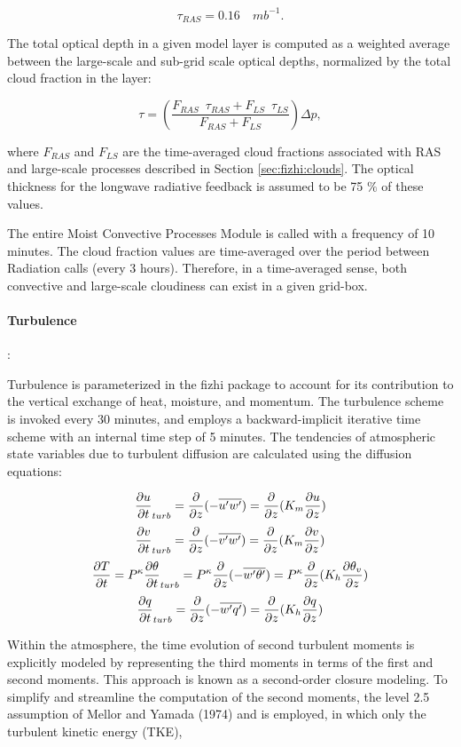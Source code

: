 \[ \tau_{RAS} = 0.16 \quad mb^{-1} . \]

The total optical depth in a given model layer is computed as a weighted average between
the large-scale and sub-grid scale optical depths, normalized by the total cloud fraction in the
layer:

\[ \tau = \left( \frac{F_{RAS} \,\,\, \tau_{RAS} + F_{LS} \,\,\, \tau_{LS} }{ F_{RAS}+F_{LS} } \right) \Delta p, \]

where $F_{RAS}$ and $F_{LS}$ are the time-averaged cloud fractions associated with RAS and large-scale
processes described in Section \ref{sec:fizhi:clouds}.
The optical thickness for the longwave radiative feedback is assumed to be 75 $\%$ of these values.

The entire Moist Convective Processes Module is called with a frequency of 10 minutes. 
The cloud fraction values are time-averaged over the period between Radiation calls (every 3
hours).  Therefore, in a time-averaged sense, both convective and large-scale 
cloudiness can exist in a given grid-box.  

\paragraph{Turbulence}:

Turbulence is parameterized in the fizhi package to account for its contribution to the
vertical exchange of heat, moisture, and momentum.  
The turbulence scheme is invoked every 30 minutes, and employs a backward-implicit iterative 
time scheme with an internal time step of 5 minutes.
The tendencies of atmospheric state variables due to turbulent diffusion are calculated using
the diffusion equations:

\[
{\frac{\partial u}{\partial t}}_{turb} = {\frac{\partial }{\partial z} }{(- \overline{u^{\prime}w^{\prime}})}
 = {\frac{\partial }{\partial z} }{(K_m \frac{\partial u}{\partial z})}
\]
\[
{\frac{\partial v}{\partial t}}_{turb} = {\frac{\partial }{\partial z} }{(- \overline{v^{\prime}w^{\prime}})}
 = {\frac{\partial }{\partial z} }{(K_m \frac{\partial v}{\partial z})}
\]
\[
{\frac{\partial T}{\partial t}} = P^{\kappa}{\frac{\partial \theta}{\partial t}}_{turb} = 
P^{\kappa}{\frac{\partial }{\partial z} }{(- \overline{w^{\prime}\theta^{\prime}})}
 = P^{\kappa}{\frac{\partial }{\partial z} }{(K_h \frac{\partial \theta_v}{\partial z})}
\]
\[
{\frac{\partial q}{\partial t}}_{turb} = {\frac{\partial }{\partial z} }{(- \overline{w^{\prime}q^{\prime}})}
 = {\frac{\partial }{\partial z} }{(K_h \frac{\partial q}{\partial z})}
\]

Within the atmosphere, the time evolution
of second turbulent moments is explicitly modeled by representing the third moments in terms of 
the first and second moments.  This approach is known as a second-order closure modeling.
To simplify and streamline the computation of the second moments, the level 2.5 assumption
of Mellor and Yamada (1974) and \cite{yam:77} is employed, in which only the turbulent 
kinetic energy (TKE),

